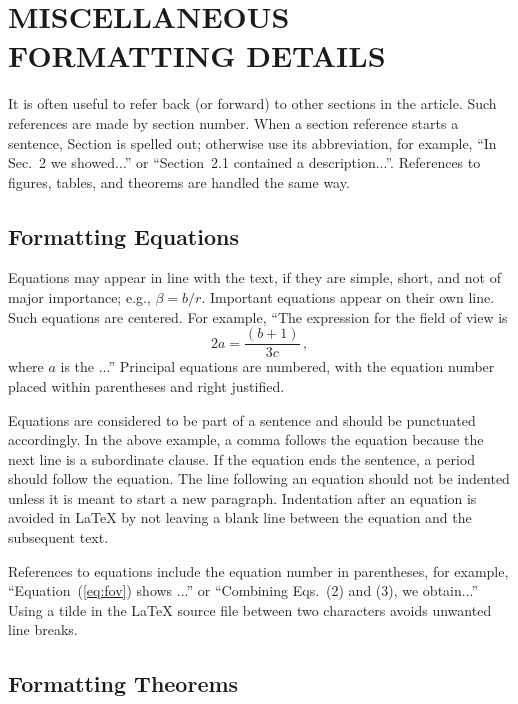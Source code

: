 \appendix    %

\section{MISCELLANEOUS FORMATTING DETAILS}
\label{sec:misc}

It is often useful to refer back (or forward) to other sections in the article.  Such references are made by section number.  When a section reference starts a sentence, Section is spelled out; otherwise use its abbreviation, for example, ``In Sec.~2 we showed...'' or ``Section~2.1 contained a description...''.  References to figures, tables, and theorems are handled the same way.

\subsection{Formatting Equations}
Equations may appear in line with the text, if they are simple, short, and not of major importance; e.g., $\beta = b/r$.  Important equations appear on their own line.  Such equations are centered.  For example, ``The expression for the field of view is
\begin{equation}
\label{eq:fov}
2 a = \frac{(b + 1)}{3c} \, ,
\end{equation}
where $a$ is the ...'' Principal equations are numbered, with the equation number placed within parentheses and right justified.

Equations are considered to be part of a sentence and should be punctuated accordingly. In the above example, a comma follows the equation because the next line is a subordinate clause.  If the equation ends the sentence, a period should follow the equation.  The line following an equation should not be indented unless it is meant to start a new paragraph.  Indentation after an equation is avoided in LaTeX by not leaving a blank line between the equation and the subsequent text.

References to equations include the equation number in parentheses, for example, ``Equation~(\ref{eq:fov}) shows ...'' or ``Combining Eqs.~(2) and (3), we obtain...''  Using a tilde in the LaTeX source file between two characters avoids unwanted line breaks.

\subsection{Formatting Theorems}

